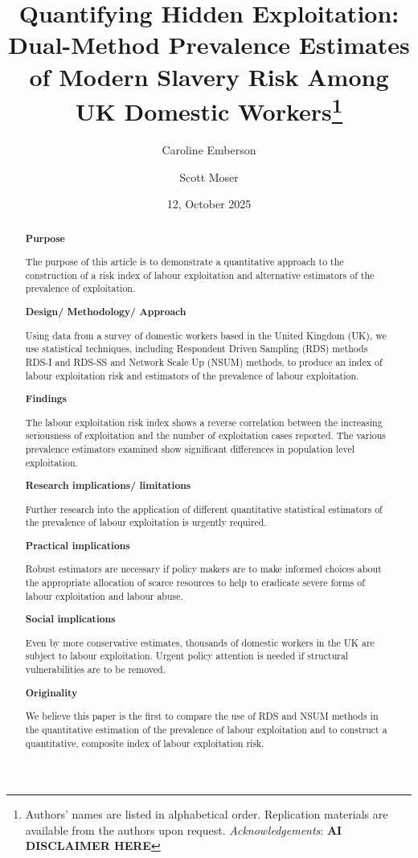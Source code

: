 \documentclass[
  12pt,
  letterpaper,
  DIV=11,
  numbers=noendperiod]{scrartcl}
\title{Quantifying Hidden Exploitation: Dual-Method Prevalence Estimates
of Modern Slavery Risk Among UK Domestic Workers\footnote{Authors' names
  are listed in alphabetical order. Replication materials are available
  from the authors upon request. \emph{Acknowledgements}: \textbf{AI
  DISCLAIMER HERE}}}
\author{Caroline Emberson \and Scott Moser}
\date{12, October 2025}
\theoremstyle{plain}
\theoremstyle{definition}
\begin{document}
\maketitle
\begin{abstract}
\textbf{Purpose}

The purpose of this article is to demonstrate a quantitative approach to
the construction of a risk index of labour exploitation and alternative
estimators of the prevalence of exploitation.

\textbf{Design/ Methodology/ Approach}

Using data from a survey of domestic workers based in the United Kingdom
(UK), we use statistical techniques, including Respondent Driven
Sampling (RDS) methods RDS-I and RDS-SS and Network Scale Up (NSUM)
methods, to produce an index of labour exploitation risk and estimators
of the prevalence of labour exploitation.

\textbf{Findings}

The labour exploitation risk index shows a reverse correlation between
the increasing seriousness of exploitation and the number of
exploitation cases reported. The various prevalence estimators examined
show significant differences in population level exploitation.

\textbf{Research implications/ limitations}

Further research into the application of different quantitative
statistical estimators of the prevalence of labour exploitation is
urgently required.

\textbf{Practical implications}

Robust estimators are necessary if policy makers are to make informed
choices about the appropriate allocation of scarce resources to help to
eradicate severe forms of labour exploitation and labour abuse.

\textbf{Social implications}

Even by more conservative estimates, thousands of domestic workers in
the UK are subject to labour exploitation. Urgent policy attention is
needed if structural vulnerabilities are to be removed.

\textbf{Originality}

We believe this paper is the first to compare the use of RDS and NSUM
methods in the quantitative estimation of the prevalence of labour
exploitation and to construct a quantitative, composite index of labour
exploitation risk.
\end{abstract}
\end{document}
